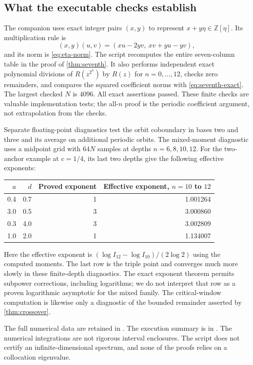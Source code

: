 \documentclass[11pt,a4paper]{article}
\numberwithin{equation}{section}
\theoremstyle{definition}
\theoremstyle{remark}
\newcommand{\ZZ}{\mathbb Z}
\newcommand{\code}[1]{\texttt{\detokenize{#1}}}
\begin{document}
\subsection{What the executable checks establish}
The companion \code{verify.py} uses exact integer pairs $(x,y)$ to
represent $x+y\eta\in\ZZ[\eta]$. Its multiplication rule is
\[
 (x,y)(u,v)=(xu-2yv,\ xv+yu-yv),
\]
and its norm is \cref{eq:eta-norm}. The script recomputes the entire
seven-column table in the proof of \cref{thm:seventh}. It also performs
independent exact polynomial divisions of $R(z^{2^n})$ by $R(z)$ for
$n=0,\ldots,12$, checks zero remainders, and compares the squared
coefficient norms with \cref{eq:seventh-exact}. The largest checked
$N$ is $4096$. All exact assertions passed. These finite checks are
valuable implementation tests; the all-$n$ proof is the periodic
coefficient argument, not extrapolation from the checks.

Separate floating-point diagnostics test the orbit coboundary in
bases two and three and its average on additional periodic orbits.
The mixed-moment diagnostic uses a midpoint grid with $64N$ samples
at depths $n=6,8,10,12$. For the two-anchor example at $c=1/4$, its
last two depths give the following effective exponents:
\begin{center}
\begin{tabular}{@{}rrrr@{}}
\toprule
$a$ & $d$ & Proved exponent & Effective exponent, $n=10$ to $12$\\
\midrule
0.4 & 0.7 & 1 & 1.001264\\
3.0 & 0.5 & 3 & 3.000860\\
0.3 & 4.0 & 3 & 3.002809\\
1.0 & 2.0 & 1 & 1.134007\\
\bottomrule
\end{tabular}
\end{center}
Here the effective exponent is
$(\log I_{12}-\log I_{10})/(2\log2)$ using the computed moments.
The last row is the triple point and converges much more slowly in
these finite-depth diagnostics. The exact exponent theorem permits
subpower corrections, including logarithms; we do not interpret that
row as a proven logarithmic asymptotic for the mixed family. The
critical-window computation is likewise only a diagnostic of the
bounded remainder asserted by \cref{thm:crossover}.

The full numerical data are retained in
. The execution summary is in
.
The numerical integrations are not rigorous interval enclosures.
The script does not certify an infinite-dimensional spectrum, and none
of the proofs relies on a collocation eigenvalue.
\end{document}

